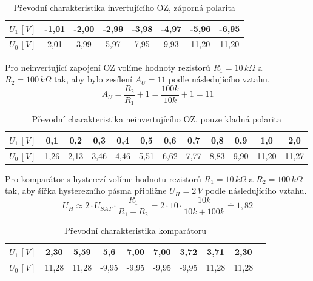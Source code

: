 \documentclass[12pt]{article} %
\begin{document}
\begin{table}[H]
\center
\caption{Převodní charakteristika invertujícího OZ, záporná polarita}
\begin{tabular}{|c|c|c|c|c|c|c|c|}
\hline 
$U_1\,[V]$ & -1,01 & -2,00 & -2,99 & -3,98 & -4,97 & -5,96 & -6,95 \\ 
\hline 
$U_0\,[V]$ & 2,01 & 3,99 & 5,97 & 7,95 & 9,93 & 11,20 & 11,20 \\ 
\hline 
\end{tabular}
\end{table}

Pro neinvertující zapojení OZ volíme hodnoty rezistorů $R_1=10\,k\Omega$ a $R_2=100\,k\Omega$ tak, aby bylo zesílení $A_U=11$ podle následujícího vztahu.
\begin{equation}
A_U = \frac{R_2}{R_1}+1=\frac{100k}{10k}+1=11
\end{equation}

\begin{table}[H]
\center
\caption{Převodní charakteristika neinvertujícího OZ, pouze kladná polarita}
\begin{tabular}{|c|c|c|c|c|c|c|c|c|c|c|c|}
\hline 
$U_1\,[V]$ & 0,1 & 0,2 & 0,3 & 0,4 & 0,5 & 0,6 & 0,7 & 0,8 & 0,9 & 1,0 & 2,0 \\ 
\hline 
$U_0\,[V]$ & 1,26 & 2,13 & 3,46 & 4,46 & 5,51 & 6,62 & 7,77 & 8,83 & 9,90 & 11,20 & 11,27 \\ 
\hline 
\end{tabular}
\end{table}

Pro komparátor s hysterezí volíme hodnotu rezistorů $R_1=10\,k\Omega$ a $R_2=100\,k\Omega$ tak, aby šířka hysterezního pásma přibližne $U_H=2\,V$ podle následujícího vztahu.
\begin{equation}
U_H \approx 2\cdot U_{SAT}\cdot \frac{R_1}{R_1+R_2}=2\cdot 10\cdot \frac{10k}{10k+100k}\doteq 1,82
\end{equation}

\begin{table}[H]
\center
\caption{Převodní charakteristika komparátoru}
\begin{tabular}{|c|c|c|c|c||c|c|c|c|c|}
\hline 
$U_1\,[V]$ & 2,30 & 5,59 & 5,6 & 7,00 & 7,00 & 3,72 & 3,71 & 2,30 \\ 
\hline 
$U_0\,[V]$ & 11,28 & 11,28 & -9,95 & -9,95 & -9,95 & -9,95 & 11,28 & 11,28 \\ 
\hline
\end{tabular} 
\end{table}
\end{document}
